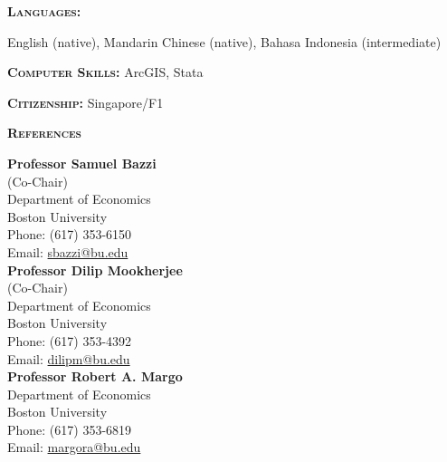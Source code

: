 \documentclass[11pt,overlapped,line,letterpaper]{res}
\newenvironment{list1}{
  \begin{list}{\ding{113}}{%
      \setlength{\itemsep}{0in} \setlength{\itemindent}{-1.6em}
      \setlength{\parsep}{0in} \setlength{\parskip}{0in}
      \setlength{\topsep}{0in} \setlength{\partopsep}{0in}
      \setlength{\leftmargin}{0.5in}}}{\end{list}}
\begin{document}
\begin{resume}

\newpage

\begin{flushleft}
\textbf{\textsc{Languages:}} 
\begin{list1}
\item[] English (native), Mandarin Chinese (native), Bahasa Indonesia (intermediate)
\end{list1}
\end{flushleft}
\vspace{-15pt}

\begin{flushleft}
\textbf{\textsc{Computer Skills:}} ArcGIS, Stata
\end{flushleft}
\vspace{-15pt}

\begin{flushleft}
\textbf{\textsc{Citizenship:}} Singapore/F1
\end{flushleft}
\vspace{-15pt}

\begin{flushleft}
\textbf{\textsc{References}}
\end{flushleft}
\vspace{-15pt}
\begin{multicols}{3}
{\bf Professor Samuel Bazzi} \\
(Co-Chair) \\
Department of Economics \\
Boston University \\
Phone: (617) 353-6150 \\ 
Email: \href{mailto:sbazzi@bu.edu}{sbazzi@bu.edu} \\

{\bf Professor Dilip Mookherjee} \\
(Co-Chair) \\
Department of Economics \\
Boston University \\
Phone: (617) 353-4392 \\ 
Email: \href{mailto:dilipm@bu.edu}{dilipm@bu.edu} \\

{\bf Professor Robert A. Margo} \\
Department of Economics \\
Boston University \\
Phone: (617) 353-6819 \\ 
Email: \href{mailto:margora@bu.edu}{margora@bu.edu} \\
\end{multicols}
\end{resume}
\end{document}
